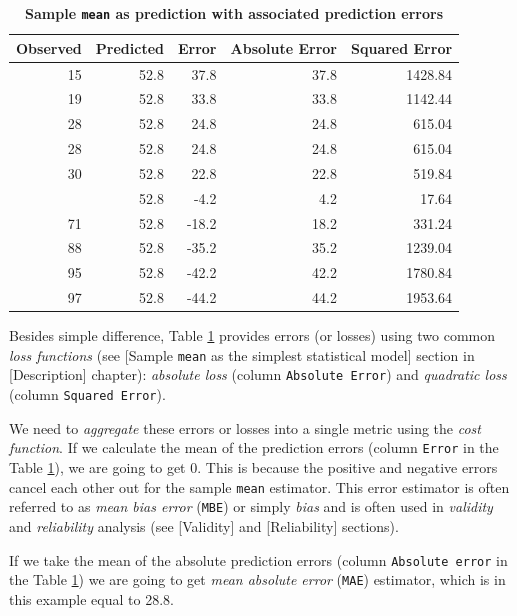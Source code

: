 \documentclass[
]{book}
\begin{document}
\begin{table}

\caption{\label{tab:mean-as-prediction-differences}\textbf{Sample \texttt{mean} as prediction with associated prediction errors}}
\centering
\begin{tabular}[t]{rrrrr}
\toprule
Observed & Predicted & Error & Absolute Error & Squared Error\\
\midrule
15 & 52.8 & 37.8 & 37.8 & 1428.84\\
19 & 52.8 & 33.8 & 33.8 & 1142.44\\
28 & 52.8 & 24.8 & 24.8 & 615.04\\
28 & 52.8 & 24.8 & 24.8 & 615.04\\
30 & 52.8 & 22.8 & 22.8 & 519.84\\
\addlinespace
57 & 52.8 & -4.2 & 4.2 & 17.64\\
71 & 52.8 & -18.2 & 18.2 & 331.24\\
88 & 52.8 & -35.2 & 35.2 & 1239.04\\
95 & 52.8 & -42.2 & 42.2 & 1780.84\\
97 & 52.8 & -44.2 & 44.2 & 1953.64\\
\bottomrule
\end{tabular}
\end{table}

Besides simple difference, Table \ref{tab:mean-as-prediction-differences} provides errors (or losses) using two common \emph{loss functions} (see {[}Sample \texttt{mean} as the simplest statistical model{]} section in {[}Description{]} chapter): \emph{absolute loss} (column \texttt{Absolute\ Error}) and \emph{quadratic loss} (column \texttt{Squared\ Error}).

We need to \emph{aggregate} these errors or losses into a single metric using the \emph{cost function}. If we calculate the mean of the prediction errors (column \texttt{Error} in the Table \ref{tab:mean-as-prediction-differences}), we are going to get 0. This is because the positive and negative errors cancel each other out for the sample \texttt{mean} estimator. This error estimator is often referred to as \emph{mean bias error} (\texttt{MBE}) or simply \emph{bias} and is often used in \emph{validity} and \emph{reliability} analysis (see {[}Validity{]} and {[}Reliability{]} sections).

If we take the mean of the absolute prediction errors (column \texttt{Absolute\ error} in the Table \ref{tab:mean-as-prediction-differences}) we are going to get \emph{mean absolute error} (\texttt{MAE}) estimator, which is in this example equal to 28.8.
\end{document}

